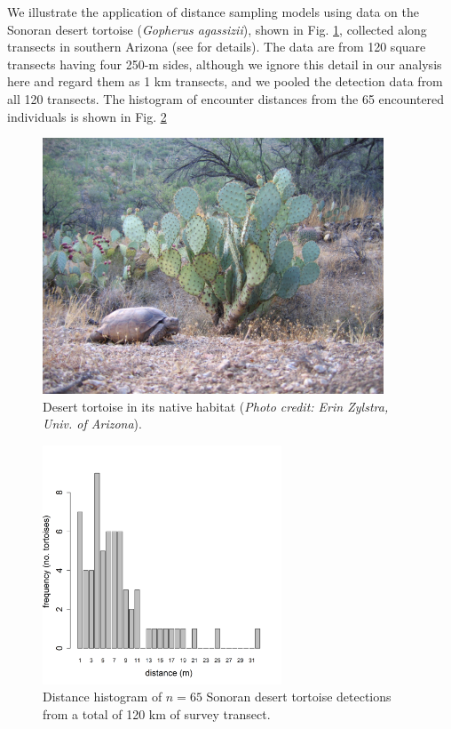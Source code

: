 We illustrate the application of distance sampling models using data
on the Sonoran desert tortoise ({\it Gopherus agassizii}), shown in
Fig. \ref{closed.fig.tortoise}, collected along transects
in southern Arizona (see \citet{zylstra_etal:2010} for
details). The data are from 120 square transects having four 250-m sides,
 although we ignore this detail in our analysis here and regard
them as 1 km transects, and we pooled the detection data from all
120 transects. The histogram of encounter distances from the 65
encountered individuals is
shown in Fig. \ref{closed.fig.tortoisehist}
\begin{figure}[ht]
\centering
\includegraphics[height=3in,width=4in]{Ch4-Closed/figs/Erin_Zylstra_2.jpg}
\caption{Desert tortoise in its native habitat ({\it Photo credit: Erin
  Zylstra, Univ. of Arizona}).}
\label{closed.fig.tortoise}
\end{figure}

\begin{figure}[ht]
\centering
\includegraphics[height=2.8in,width=2.8in]{Ch4-Closed/figs/tortoise.png}
\caption{
Distance histogram of $n=65$ Sonoran desert tortoise detections from a
total of 120 km of
survey transect. }
\label{closed.fig.tortoisehist}
\end{figure}


